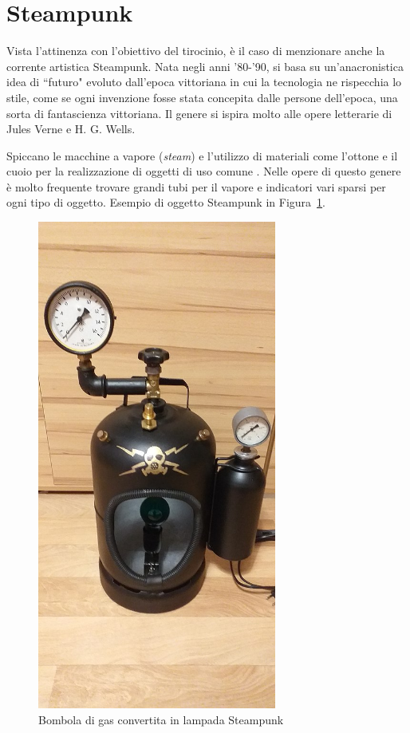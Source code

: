 \documentclass[12pt,a4paper]{report}
\begin{document}
\section{Steampunk}
Vista l'attinenza con l'obiettivo del tirocinio, è il caso di menzionare anche la corrente artistica Steampunk.
Nata negli anni '80-'90, si basa su un'anacronistica idea di ``futuro" evoluto dall'epoca vittoriana in cui la tecnologia ne rispecchia lo stile,
come se ogni invenzione fosse stata concepita dalle persone dell'epoca, una sorta di fantascienza vittoriana.
Il genere si ispira molto alle opere letterarie di Jules Verne e H. G. Wells.

Spiccano le macchine a vapore (\emph{steam}) e l'utilizzo di materiali come l'ottone e il cuoio per la realizzazione di oggetti di uso comune \cite{focussteampunk}.
Nelle opere di questo genere è molto frequente trovare grandi tubi per il vapore e indicatori vari sparsi per ogni tipo di oggetto.
Esempio di oggetto Steampunk in Figura~\ref{fig:steampunklamp}.

\begin{figure}[h]
  \centering
  \includegraphics[width=0.7\textwidth]{steampunklamp}
  \caption{Bombola di gas convertita in lampada Steampunk \cite{wiki:steampunklamp}}
  \label{fig:steampunklamp}
\end{figure}
\end{document}
